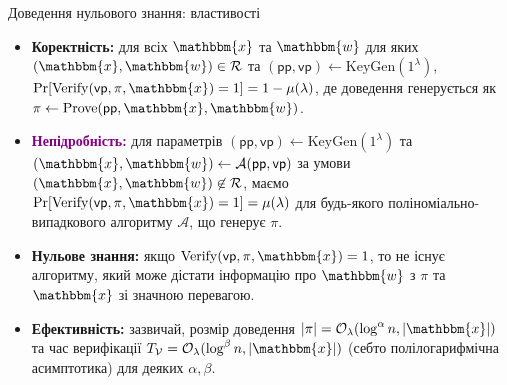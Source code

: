 \documentclass{zkdl-presentation-template}
\begin{document}
    \begin{frame}{Доведення нульового знання: властивості}
        \begin{itemize}
            \item \textcolor{blue!80!black}{\textbf{Коректність:}} для всіх
            $\mathbbm{x}$ та $\mathbbm{w}$ для яких $(\mathbbm{x}, \mathbbm{w})
            \in \mathcal{R}$ та $(\mathsf{pp},\mathsf{vp}) \gets
            \mathrm{KeyGen}(1^{\lambda})$,
            $\text{Pr}[\mathrm{Verify}(\mathsf{vp}, \pi, \mathbbm{x}) = 1] =
            1-\mu(\lambda)$, де доведення генерується як $\pi \gets
            \mathrm{Prove}(\mathsf{pp}, \mathbbm{x}, \mathbbm{w})$.
            \item \textcolor{purple}{\textbf{Непідробність:}} для параметрів
            $(\mathsf{pp},\mathsf{vp}) \gets \mathrm{KeyGen}(1^{\lambda})$ та
            $(\mathbbm{x},\mathbbm{w}) \gets
            \mathcal{A}(\mathsf{pp},\mathsf{vp})$ за умови $(\mathbbm{x},
            \mathbbm{w}) \not\in \mathcal{R}$, маємо
            $\text{Pr}[\mathrm{Verify}(\mathsf{vp}, \pi, \mathbbm{x}) = 1] =
            \mu(\lambda)$ для будь-якого поліноміально-випадкового алгоритму
            $\mathcal{A}$, що генерує $\pi$.
            \item \textcolor{green!60!black}{\textbf{Нульове знання:}} якщо
            $\mathrm{Verify}(\mathsf{vp}, \pi, \mathbbm{x}) = 1$, то не існує
            алгоритму, який може дістати інформацію про $\mathbbm{w}$ з $\pi$ та
            $\mathbbm{x}$ зі значною перевагою.
            \item \textcolor{orange!80!black}{\textbf{Ефективність:}} зазвичай,
            розмір доведення $|\pi| = \mathcal{O}_{\lambda}(\log^{\alpha} n,
            |\mathbbm{x}|)$ та час верифікації $T_{\mathcal{V}} =
            \mathcal{O}_{\lambda}(\log^{\beta} n, |\mathbbm{x}|)$ (себто
            полілогарифмічна асимптотика) для деяких $\alpha,\beta$.
            
        \end{itemize}
    \end{frame}
\end{document}
